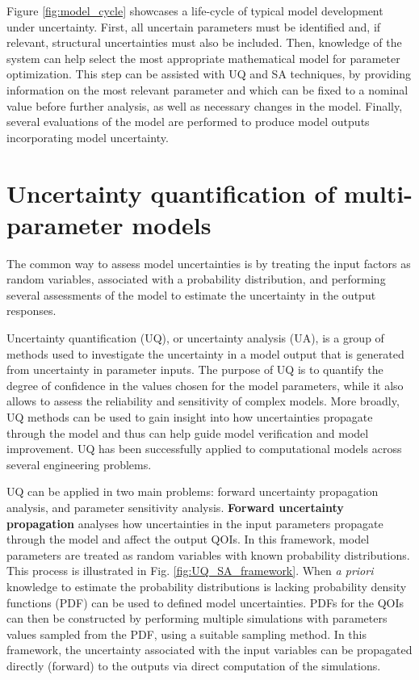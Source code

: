 \documentclass[12pt]{article}
\begin{document}
  Figure \ref{fig:model_cycle} showcases a life-cycle of typical model development under uncertainty. First, all uncertain parameters must be identified and, if relevant, structural uncertainties must also be included. Then, knowledge of the system can help select the most appropriate mathematical model for parameter optimization. This step can be assisted with UQ and SA techniques, by providing information on the most relevant parameter and which can be fixed to a nominal value before further analysis, as well as necessary changes in the model. Finally, several evaluations of the model are performed to produce model outputs incorporating model uncertainty.
 

  \section{Uncertainty quantification of multi-parameter models} \label{sec:UQ}
  
   The common way to assess model uncertainties is by treating the input factors as random variables, associated with a probability distribution, and performing several assessments of the model to estimate the uncertainty in the output responses.
   
    
Uncertainty quantification (UQ), or uncertainty analysis (UA), is a group of methods used to investigate the uncertainty in a model output that is generated from uncertainty in parameter inputs. The purpose of UQ is to quantify the degree of confidence in the values chosen for the model parameters, while it also allows to assess the reliability and sensitivity of complex  models. More broadly, UQ methods can be used to gain insight into how uncertainties propagate through the model and thus can help guide model verification and model improvement. UQ has been successfully applied to computational models across several engineering problems. 
  	
UQ can be applied in two main problems: forward uncertainty propagation analysis, and parameter sensitivity analysis.
 \textbf{Forward uncertainty propagation} analyses how uncertainties in the input parameters propagate through the model and affect the output  QOIs. In this framework, model parameters are treated as random variables with known probability distributions. This process is illustrated in Fig. \ref{fig:UQ_SA_framework}. When \textit{a priori} knowledge to estimate the probability distributions is lacking probability density functions (PDF) can be used to defined model uncertainties. PDFs for the QOIs can then be constructed by performing multiple simulations with parameters values sampled from the PDF, using a suitable sampling method. In this framework, the uncertainty  associated with the input variables can be propagated directly (forward) to the outputs via direct computation of the simulations. %
 
\end{document}
